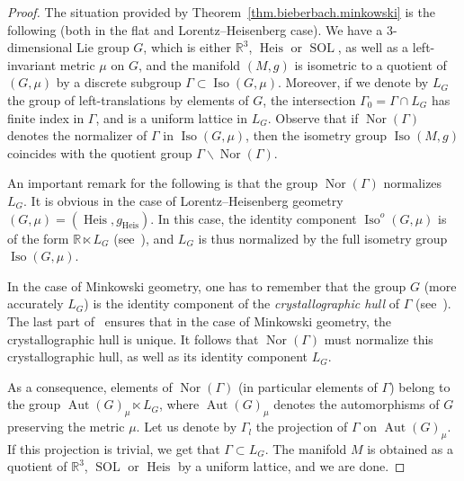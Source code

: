 \documentclass[11pt]{article}
\theoremstyle{definition}
\numberwithin{equation}{section}
\numberwithin{figure}{section}
\numberwithin{table}{section}
\DeclareMathOperator{\Aut}{Aut}
\DeclareMathOperator{\Iso}{Iso}
\DeclareMathOperator{\Nor}{Nor}
\DeclareMathOperator{\Sol}{SOL}
\DeclareMathOperator{\Heis}{Heis}
\newcommand*\RR{\mathbb{R}}
\begin{document}
\begin{proof}
The situation provided by Theorem~\ref{thm.bieberbach.minkowski} is the following (both in the flat and Lorentz--Heisenberg case). We have a $3$-dimensional Lie group $G$, which is either $\RR^3$, $\Heis$ or $\Sol$, as well as a left-invariant metric $\mu$ on $G$, and the manifold $(M,g)$ is isometric to a quotient of $(G,\mu)$ by a discrete subgroup $\Gamma \subset \Iso(G,\mu)$. Moreover, if we denote by $L_G$ the group of left-translations by elements of $G$, the intersection $\Gamma_0=\Gamma \cap L_G$ has finite index in $\Gamma$, and is a uniform lattice in $L_G$. Observe that if $\Nor(\Gamma)$ denotes the normalizer of $\Gamma$ in $\Iso(G,\mu)$, then the isometry group $\Iso(M,g)$ coincides with the quotient group $\Gamma \backslash \Nor(\Gamma)$.

An important remark for the following is that the group $\Nor(\Gamma)$ normalizes $L_G$. It is obvious in the case of Lorentz--Heisenberg geometry $(G,\mu)=(\Heis,g_{\Heis})$. In this case, the identity component $\Iso^o(G,\mu)$ is of the form $\RR \ltimes L_G$ (see~\cite[Section~4.1]{sorin.ghani}), and $L_G$ is thus normalized by the full isometry group $\Iso(G,\mu)$.

In the case of Minkowski geometry, one has to remember that the group $G$ (more accurately $L_G$) is the identity component of the \emph{crystallographic hull} of $\Gamma$ (see~\cite[Section~1.4]{fried.goldman}). The last part of~\cite[Theorem~1.4]{fried.goldman} ensures that in the case of Minkowski geometry, the crystallographic hull is unique. It follows that $\Nor(\Gamma)$ must normalize this crystallographic hull, as well as its identity component $L_G$.

As a consequence, elements of $\Nor(\Gamma)$ (in particular elements of $\Gamma$) belong to the group $\Aut(G)_{\mu} \ltimes L_G$, where $\Aut(G)_{\mu}$ denotes the automorphisms of $G$ preserving the metric $\mu$. Let us denote by $\Gamma_l$ the projection of $\Gamma$ on $\Aut(G)_{\mu}$. If this projection is trivial, we get that $\Gamma \subset L_G$. The manifold $M$ is obtained as a quotient of $\RR^3$, $ \Sol$ or $ \Heis$ by a uniform lattice, and we are done.



\end{proof}
\end{document}
